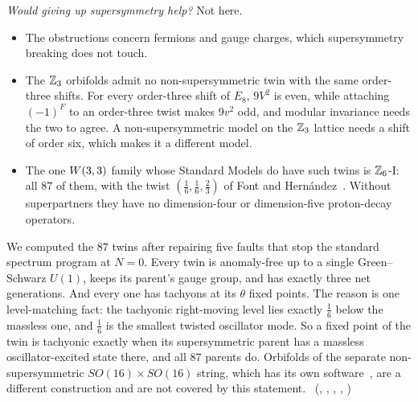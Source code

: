\emph{Would giving up supersymmetry help?} Not here.
\begin{itemize}
\item The obstructions concern fermions and gauge charges, which supersymmetry breaking does not touch.
\item The $\mathbb{Z}_3$ orbifolds admit no non-supersymmetric twin with the same order-three shifts. For every
      order-three shift of $E_8$, $9V^2$ is even, while attaching $(-1)^F$ to an order-three twist makes $9v^2$
      odd, and modular invariance needs the two to agree. A non-supersymmetric model on the $\mathbb{Z}_3$ lattice
      needs a shift of order six, which makes it a different model.
\item The one $W(3,3)$ family whose Standard Models do have such twins is $\mathbb{Z}_6$-I: all $87$ of them, with the twist
      $(\tfrac16,\tfrac16,\tfrac23)$ of Font and Hern\'andez~\cite{FontHernandez2002}. Without superpartners
      they have no dimension-four or dimension-five proton-decay operators.
\end{itemize}
We computed the $87$ twins after repairing five faults that stop the standard spectrum program at $N=0$. Every
twin is anomaly-free up to a single Green--Schwarz $U(1)$, keeps its parent's gauge group, and has exactly
three net generations. And every one has tachyons at its $\theta$ fixed points. The reason is one
level-matching fact: the tachyonic right-moving level lies exactly $\tfrac16$ below the massless one, and
$\tfrac16$ is the smallest twisted oscillator mode. So a fixed point of the twin is tachyonic exactly when its
supersymmetric parent has a massless oscillator-excited state there, and all $87$ parents do. Orbifolds of the
separate non-supersymmetric $SO(16)\times SO(16)$ string, which has its own
software~\cite{EscalanteNotario2025}, are a different construction and are not covered by this statement.
\tierC\ (,
,
,
,
)

